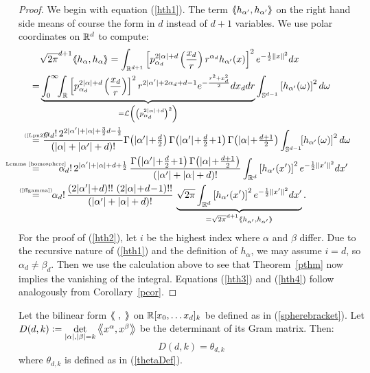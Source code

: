 \begin{proof}
We begin with equation (\ref{hth1}). The term $\left<\!\!\!\:\left< h_{\alpha '},h_{\alpha '}\right>\!\!\!\:\right>$ on the right hand side means of course the form in $d$ instead of $d\!+\!1$ variables. We use polar coordinates on $\mathbb{R}^d$ to compute:
\begin{align*}
 & \sqrt{2\pi}^{d+1}\!\bra h_\alpha ,h_\alpha \ket = \int_{\R^{d+1}}\left[\pol{\alpha_d}{2|\alpha|+d}\left(\frac{x_d}{r}\right) r^{\alpha_d}h_{\alpha'}(x)\right]^2 e^{-\frac{1}{2}\|x\|^2} dx \\
 = & \underbrace{ \int_0^\infty\!\!\int_{\R} \left[\pol{\alpha_d}{2|\alpha|+d}\left(\frac{x_d}{r}\right)\right]^2 r^{2|\alpha'|+2\alpha_d+d-1} e^{-\frac{r^2+x_d^2}{2} }dx_ddr}_{= \L\left(\left(\pol{\alpha_d}{2|\alpha|+d}\right)^2\right)}
 \int_{\S^{d-1}}\left[h_{\alpha'}(\omega)\right]^2 d\omega \\
\myeq{(\ref{Lpn2})}& \  \frac{\alpha_d!\, 2^{2|\alpha '|+|\alpha|+\frac{3}{2}d-\frac{1}{2}} }{\left(|\alpha|+|\alpha'|+d\right)!} { \textstyle
\Gamma\!\left( |\alpha'| \!+\!\frac{d}{2}\right)\Gamma\!\left( |\alpha'|\!+\! \frac{d}{2}\!+\! 1\right) \Gamma\!\left( |\alpha| \!+\! \frac{d+1}{2}\right) }\int_{\S^{d-1}}\!\!\left[h_{\alpha'}(\omega)\right]^2 d\omega \\
\myeq{Lemma~\ref{homosphere}}&\quad\quad \alpha_d!\,2^{|\alpha '|+|\alpha |+d+\frac{1}{2}}\,
\frac{\Gamma\!\left(|\alpha '|\!+\!\frac{d}{2}\!+\!1\right)\Gamma\!\left(|\alpha |\!+\!\tfrac{d+1}{2}\right)}{\left(|\alpha '|+|\alpha |+d\right)!} \int_{\R^d} \left[h_{\alpha'}(x')\right]^2 e^{-\frac{1}{2}\|x'\|^2} dx' \\
\myeq{(\ref{ffgamma})}& \quad\; 
\alpha_d!\,\frac{\left(2|\alpha '|\!+\!d\right)!!\,\left(2|\alpha |\!+\!d\!-\!1\right)!!}{\left(|\alpha '|+|\alpha |+d\right)!}\, \underbrace{\sqrt{2\pi}\int_{\R^d} \left[h_{\alpha'}(x')\right]^2 e^{-\frac{1}{2}\|x'\|^2}  dx'}_{=\sqrt{2\pi}^{d+1}\bra h_{\alpha '},h_{\alpha '}\ket} .
\end{align*}
For the proof of (\ref{hth2}), let $i$ be the highest index where $\alpha$ and $\beta$ differ. Due to the recursive nature of (\ref{hth1}) and the definition of $h_\alpha$, we may assume $i=d$, so $\alpha_d \neq \beta_d$. Then we use the calculation above to see that Theorem~\ref{pthm} now implies the vanishing of the integral. Equations (\ref{hth3}) and (\ref{hth4}) follow analogously from Corollary~\ref{pcor}.
\end{proof}
\begin{theorem}\label{thetaCor} Let the bilinear form $\left<\!\!\!\:\left<\ ,\;\right>\!\!\!\:\right>$ on $\mathbb{R}[x_0,\ldots x_d]_k$ be defined as in (\ref{spherebracket}). Let $D(d,k)\vcentcolon= \det\limits_{|\alpha|,|\beta|=k}\left<\!\!\!\:\left< x^\alpha ,x^\beta \right>\!\!\!\:\right> $ be the determinant of its Gram matrix. Then:
$$
D(d,k) = \theta_{d,k}
$$
where $\theta_{d,k}$ is defined as in (\ref{thetaDef}).
\end{theorem}
